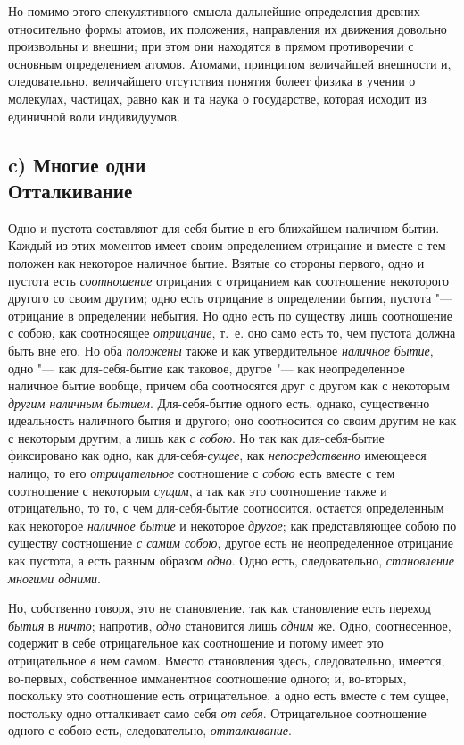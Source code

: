 Но помимо этого спекулятивного смысла дальнейшие определения древних
относительно формы атомов, их положения, направления их движения довольно
произвольны и внешни; при этом они находятся в прямом противоречии с
основным определением атомов. Атомами, принципом величайшей внешности и,
следовательно, величайшего отсутствия понятия болеет физика в учении о
молекулах, частицах, равно как и та наука о государстве, которая исходит из
единичной воли индивидуумов.

\subsection[c) Многие одни. Отталкивание]%
  {c) Многие одни\\{\mdseries\lsstyle Отталкивание}}

Одно и пустота составляют для-себя-бытие в его ближайшем наличном бытии.
Каждый из этих моментов имеет своим определением отрицание и вместе с тем
положен как некоторое наличное бытие. Взятые со стороны первого, одно и
пустота есть {\em соотношение} отрицания с отрицанием
как соотношение некоторого другого со своим другим; одно есть отрицание в
определении бытия, пустота "--- отрицание в определении небытия. Но одно есть
по существу лишь соотношение с собою, как соотносящее
{\em отрицание}, т.~е. оно само есть то, чем пустота
должна быть вне его. Но оба {\em положены} также и как
утвердительное {\em наличное бытие}, одно "--- как
для-себя-бытие как таковое, другое "--- как неопределенное наличное бытие
вообще, причем оба соотносятся друг с другом как с некоторым
{\em другим наличным бытием}. Для-себя-бытие одного
есть, однако, существенно идеальность наличного бытия и другого; оно
соотносится со своим другим не как с некоторым другим, а лишь как
{\em с собою}. Но так как для-себя-бытие фиксировано
как одно, как для-себя-{\em сущее}, как
{\em непосредственно} имеющееся налицо, то его
{\em отрицательное} соотношение с
{\em собою} есть вместе с тем соотношение с некоторым
{\em сущим}, а так как это соотношение также и
отрицательно, то то, с чем для-себя-бытие соотносится, остается
определенным как некоторое {\em наличное бытие} и
некоторое {\em другое}; как представляющее собою по
существу соотношение {\em с самим собою}, другое есть
не неопределенное отрицание как пустота, а есть равным образом
{\em одно}. Одно есть, следовательно, {\em становление многими одними}.

Но, собственно говоря, это не становление, так как становление есть переход
{\em бытия} в {\em ничто}; напротив, {\em одно} становится лишь
{\em одним} же. Одно, соотнесенное, содержит в себе
отрицательное как соотношение и потому имеет это отрицательное
{\em в} нем самом. Вместо становления здесь,
следовательно, имеется, во-первых, собственное имманентное соотношение
одного; и, во-вторых, поскольку это соотношение есть отрицательное, а одно
есть вместе с тем сущее, постольку одно отталкивает само себя
{\em от себя}. Отрицательное соотношение одного с собою
есть, следовательно, {\em отталкивание}.

